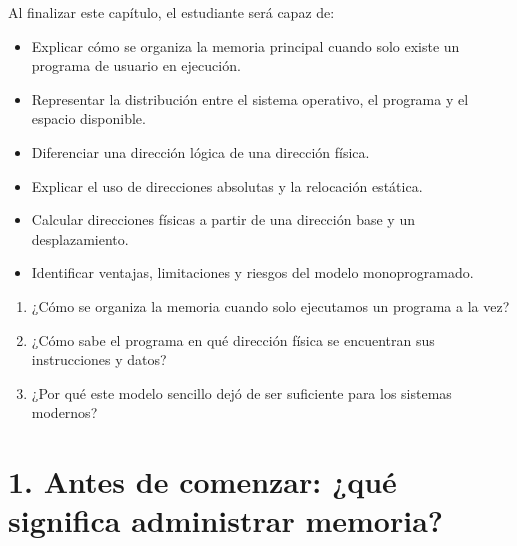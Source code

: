 \documentclass[
  spanish,
  letterpaper,
]{scrbook}
\providecommand{\tightlist}{%
  \setlength{\itemsep}{0pt}\setlength{\parskip}{0pt}}
\begin{document}
Al finalizar este capítulo, el estudiante será capaz de:

\begin{itemize}
\tightlist
\item
  Explicar cómo se organiza la memoria principal cuando solo existe un
  programa de usuario en ejecución.
\item
  Representar la distribución entre el sistema operativo, el programa y
  el espacio disponible.
\item
  Diferenciar una dirección lógica de una dirección física.
\item
  Explicar el uso de direcciones absolutas y la relocación estática.
\item
  Calcular direcciones físicas a partir de una dirección base y un
  desplazamiento.
\item
  Identificar ventajas, limitaciones y riesgos del modelo
  monoprogramado.
\end{itemize}

\begin{tcolorbox}[enhanced jigsaw, arc=.35mm, bottomrule=.15mm, bottomtitle=1mm, breakable, colback=white, colbacktitle=quarto-callout-tip-color!10!white, colframe=quarto-callout-tip-color-frame, coltitle=black, left=2mm, leftrule=.75mm, opacityback=0, opacitybacktitle=0.6, rightrule=.15mm, title=\textcolor{quarto-callout-tip-color}{\faLightbulb}\hspace{0.5em}{Tres preguntas fundamentales}, titlerule=0mm, toprule=.15mm, toptitle=1mm]

\begin{enumerate}
\def\labelenumi{\arabic{enumi}.}
\tightlist
\item
  ¿Cómo se organiza la memoria cuando solo ejecutamos un programa a la
  vez?
\item
  ¿Cómo sabe el programa en qué dirección física se encuentran sus
  instrucciones y datos?
\item
  ¿Por qué este modelo sencillo dejó de ser suficiente para los sistemas
  modernos?
\end{enumerate}

\end{tcolorbox}

\section{1. Antes de comenzar: ¿qué significa administrar
memoria?}\label{antes-de-comenzar-quuxe9-significa-administrar-memoria}
\end{document}
